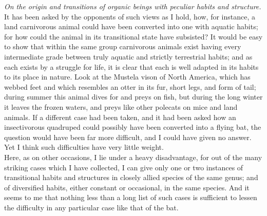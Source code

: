 \indent \emph{On the origin and transitions of organic beings with peculiar habits and structure.} It has been asked by the opponents of such views as I hold, how, for instance, a land carnivorous animal could have been converted into one with aquatic habits; for how could the animal in its transitional state have subsisted? It would be easy to show that within the same group carnivorous animals exist having every intermediate grade between truly aquatic and strictly terrestrial habits; and as each exists by a struggle for life, it is clear that each is well adapted in its habits to its place in nature. Look at the Mustela vison of North America, which has webbed feet and which resembles an otter in its fur, short legs, and form of tail; during summer this animal dives for and preys on fish, but during the long winter it leaves the frozen waters, and preys like other polecats on mice and land animals. If a different case had been taken, and it had been asked how an insectivorous quadruped could possibly have been converted into a flying bat, the question would have been far more difficult, and I could have given no answer. Yet I think such difficulties have very little weight.\\
\indent Here, as on other occasions, I lie under a heavy disadvantage, for out of the many striking cases which I have collected, I can give only one or two instances of transitional habits and structures in closely allied species of the same genus; and of diversified habits, either constant or occasional, in the same species. And it seems to me that nothing less than a long list of such cases is sufficient to lessen the difficulty in any particular case like that of the bat.\\
